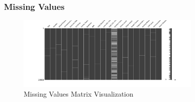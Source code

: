 \documentclass[11pt,a4paper]{article}
\begin{document}



\subsubsection{Missing Values}
\vspace{-0.25cm}

\begin{figure}[H]
    \centering
    \includegraphics[width=0.8\textwidth]{./pictures/missing_values_matrix.png}
    \caption{Missing Values Matrix Visualization}
\end{figure}
\end{document}
